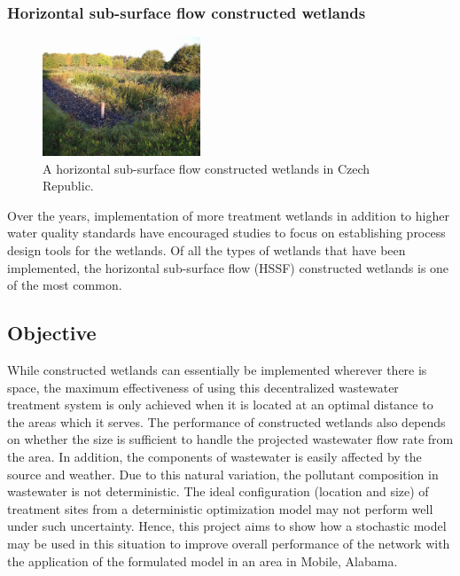 \documentclass[preprint,12pt,authoryear]{elsarticle}
\begin{document}
\subsubsection{Horizontal sub-surface flow constructed wetlands}
\begin{figure}
	\begin{center}
		\includegraphics[width=0.42\textwidth]{hssf.jpg}
	\end{center}
	\caption[A horizontal sub-surface flow constructed wetlands in Czech Republic.]{A horizontal sub-surface flow constructed wetlands in Czech Republic. \citep{vymazal2008}} 
	\label{fig:changi}
\end{figure}
Over the years, implementation of more treatment wetlands in addition to higher water quality standards have encouraged studies to focus on establishing process design tools for the wetlands. Of all the types of wetlands that have been implemented, the horizontal sub-surface flow (HSSF) constructed wetlands is one of the most common. %

\subsection{Objective}
While constructed wetlands can essentially be implemented wherever there is space, the maximum effectiveness of using this decentralized wastewater treatment system is only achieved when it is located at an optimal distance to the areas which it serves. The performance of constructed wetlands also depends on whether the size is sufficient to handle the projected wastewater flow rate from the area. In addition, the components of wastewater is easily affected by the source and weather. Due to this natural variation, the pollutant composition in wastewater is not deterministic. The ideal configuration (location and size) of treatment sites from a deterministic optimization model may not perform well under such uncertainty. Hence, this project aims to show how a stochastic model may be used in this situation to improve overall performance of the network with the application of the formulated model in an area in Mobile, Alabama. 
\end{document}
